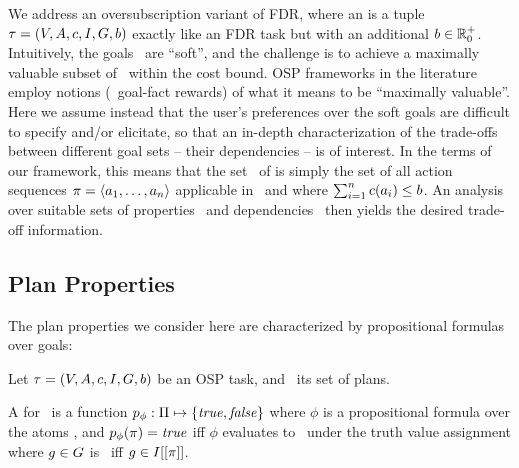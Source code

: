 We address an oversubscription variant of FDR, where an
 is a tuple $\tau =
(V,\allowbreak A,\allowbreak{\ensuremath{c}},\allowbreak I,\allowbreak G,\allowbreak{\ensuremath{b}})$
exactly like an FDR task but with an additional 
${b} \in {\mathbb{R}}^+_0$. Intuitively, the goals \goal\ are
``soft'', and the challenge is to achieve a maximally valuable subset
of \goal\ within the cost bound. OSP frameworks in the literature
employ notions (\eg\ goal-fact rewards) of what it means to be
``maximally valuable''. Here we assume instead that the user's
preferences over the soft goals are difficult to specify and/or
elicitate, so that an in-depth characterization of the trade-offs
between different goal sets -- their dependencies -- is of
interest. In the terms of our framework, this means that the set
\plans\ of  is simply the set of all action sequences
$\pi = \langle a_1, \dots, a_n\rangle$ applicable in \init\ and
where $\sum_{i=1}^n {c}(a_i) \leq {\ensuremath{b}}$. An analysis over
suitable sets of properties \props\ and dependencies \deps\ then
yields the desired trade-off information.






\subsection{Plan Properties}
\label{goaldep:properties}

The plan properties we consider here are characterized by
propositional formulas over goals:

\begin{definition}
Let $\tau =
(V,\allowbreak A,\allowbreak{\ensuremath{c}},\allowbreak I,\allowbreak G,\allowbreak{\ensuremath{b}})$
be an OSP task, and \plans\ its set of plans. 

A  for \task\ is a function $p_\phi :
\Pi \mapsto \{\mathit{true}, \mathit{false}\}$ where $\phi$ is a propositional
formula over the atoms \goal, and $p_\phi(\pi) = \mathit{true}$ iff
$\phi$ evaluates to \true\ under the truth value assignment where $g
\in G$ is \true\ iff $g \in I[[\pi]]$.
%
%
\end{definition}

